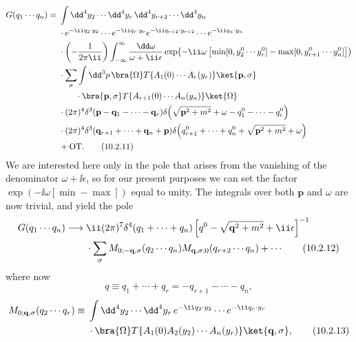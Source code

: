\begin{align}
  G(q_1\cdots q_n)={}&
  \int \dd^4y_2\cdots \dd^4y_r\,\dd^4y_{r+2}\cdots \dd^4y_n
  \notag\\
  &\cdot e^{-\ii q_2\cdot y_2}\cdots e^{-\ii q_r\cdot y_r}
  e^{-\ii q_{r+2}\cdot y_{r+2}}\cdots e^{-\ii q_n\cdot y_n}
  \notag\\
  &\cdot\left(-\frac{1}{2\pi \ii}\right)
  \int_{-\infty}^{\infty}\frac{\dd\omega}{\omega+\ii\epsilon}
  \exp\!\left(-\ii\omega\left[
  \min[0,y_2^0\cdots y_r^0]-\max[0,y_{r+1}^0\cdots y_n^0]
  \right]\right)
  \notag\\
  &\cdot\sum_\sigma\int \dd^3p\,
  \bra{\Omega}T\{A_1(0)\cdots A_r(y_r)\}\ket{\mathbf p,\sigma}
  \notag\\
  &\qquad\cdot\bra{\mathbf p,\sigma}T\{A_{r+1}(0)\cdots A_n(y_n)\}\ket{\Omega}
  \notag\\
  &\cdot(2\pi)^4\delta^3(\mathbf p-\mathbf q_1-\cdots-\mathbf q_r)
  \delta\!\left(\sqrt{\mathbf p^2+m^2}+\omega-q_1^0-\cdots-q_r^0\right)
  \notag\\
  &\cdot(2\pi)^4\delta^3(\mathbf q_{r+1}+\cdots+\mathbf q_n+\mathbf p)
  \delta\!\left(q_{r+1}^0+\cdots+q_n^0+\sqrt{\mathbf p^2+m^2}+\omega\right)
  \notag\\
  &+\mathrm{OT}.
  \tag{10.2.11}\label{eq:10.2.11}
\end{align}
We are interested here only in the pole that arises from the vanishing of
the denominator $\omega+\ii\epsilon$, so for our present purposes we can set the factor
$\exp(-\ii\omega[\min-\max])$ equal to unity. The integrals over both $\mathbf p$ and $\omega$ are
now trivial, and yield the pole
\begin{align}
  G(q_1\cdots q_n)\longrightarrow{}&
  \ii(2\pi)^7\delta^4(q_1+\cdots+q_n)
  \left[q^0-\sqrt{\mathbf q^2+m^2}+\ii\epsilon\right]^{-1}
  \notag\\
  &\cdot\sum_\sigma
  M_{0;-\mathbf q,\sigma}(q_2\cdots q_n)
  M_{\mathbf q,\sigma;0}(q_{r+2}\cdots q_n)+\cdots
  \tag{10.2.12}\label{eq:10.2.12}
\end{align}
where now
\[
  q\equiv q_1+\cdots+q_r=-q_{r+1}-\cdots-q_n,
\]
\begin{align}
  M_{0;\mathbf q,\sigma}(q_2\cdots q_r)
  \equiv{}&\int \dd^4y_2\cdots \dd^4y_r\,
  e^{-\ii q_2\cdot y_2}\cdots e^{-\ii q_r\cdot y_r}
  \notag\\
  &\cdot\bra{\Omega}T\{A_1(0)A_2(y_2)\cdots A_n(y_r)\}\ket{\mathbf q,\sigma},
  \tag{10.2.13}\label{eq:10.2.13}
\end{align}
